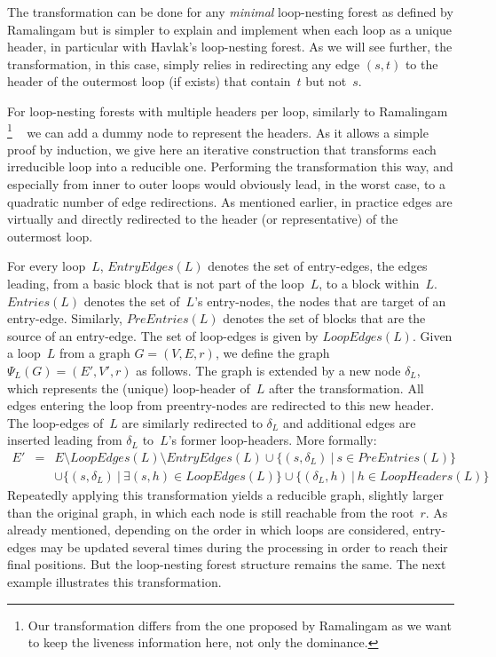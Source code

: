 The transformation can be done for any \emph{minimal} loop-nesting forest as defined by Ramalingam but is simpler to explain and implement when each loop as a unique header, in particular with Havlak's loop-nesting forest.
As we will see further, the transformation, in this case, simply relies in redirecting any edge $(s,t)$ to the header of the outermost loop (if exists) that contain~$t$ but not~$s$.

For loop-nesting forests with multiple headers per loop, similarly to Ramalingam%
\footnote{Our transformation differs from the one proposed by Ramalingam as we want to keep the liveness information here, not only the dominance.}%
~\cite{ramalingam:2002:loopforest:minimal} we can add a dummy node to represent the headers.
As it allows a simple proof by induction, we give here an iterative construction that transforms each irreducible loop into a reducible one.
Performing the transformation this way, and especially from inner to outer loops would obviously lead, in the worst case, to a quadratic number of edge redirections.
As mentioned earlier, in practice edges are virtually and directly redirected to the header (or representative) of the outermost loop.

For every loop~$L$, $\textit{EntryEdges}(L)$ denotes the set of entry-edges, \ie the edges leading, from a basic block that is not part of the loop~$L$, to a block within~$L$.
$\textit{Entries}(L)$ denotes the set of~$L$'s entry-nodes, \ie the nodes that are target of an entry-edge.
Similarly, $\textit{PreEntries}(L)$ denotes the set of blocks that are the source of an entry-edge.
The set of loop-edges is given by $\textit{LoopEdges}(L)$.
Given a loop~$L$ from a graph $G = (V, E, r)$, we define the graph $\Psi_L (G) = (E', V', r)$ as follows.
The graph is extended by a new node $\delta_L$, which represents the (unique) loop-header of~$L$ after the transformation.
All edges entering the loop from preentry-nodes are redirected to this new header.
The loop-edges of~$L$ are similarly redirected to $\delta_L$ and additional edges are inserted leading from $\delta_L$ to~$L$'s former loop-headers.
More formally:
%
\begin{eqnarray*}
  E' & = & E \setminus \textit{LoopEdges}(L) \setminus \textit{EntryEdges}(L)
\cup \{ (s, \delta_L)~|~s \in \textit{PreEntries}(L) \} \\
     &   & \cup \{ (s, \delta_L)~|~\exists (s, h) \in \textit{LoopEdges}(L) \}
\cup \{ (\delta_L, h)~|~h  \in \textit{LoopHeaders}(L) \}
\end{eqnarray*}
%
Repeatedly applying this transformation yields a reducible graph, slightly larger than the original graph, in which each node is still reachable from the root~$r$.
As already mentioned, depending on the order in which loops are considered, entry-edges may be updated several times during the processing in order to reach their final positions.
But the loop-nesting forest structure remains the same.
The next example illustrates this transformation.

